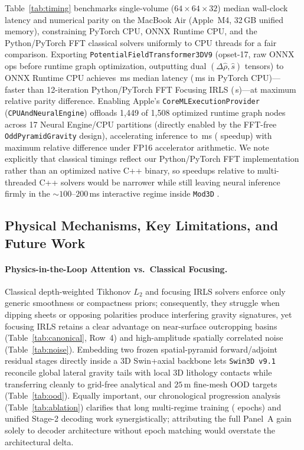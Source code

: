 \documentclass[11pt,a4paper]{article}
\begin{document}


Table~\ref{tab:timing} benchmarks single-volume ($64\times 64\times 32$) median wall-clock latency and numerical parity on the MacBook Air (Apple~M4, 32\,GB unified memory), constraining PyTorch CPU, ONNX Runtime CPU, and the Python/PyTorch FFT classical solvers uniformly to \valCpuThreads{} CPU threads for a fair comparison. Exporting \texttt{PotentialFieldTransformer3DV9} (opset-17, \valOnnxNodes{} raw ONNX ops before runtime graph optimization, outputting dual $(\Delta\hat{\rho}, \hat{s})$ tensors) to ONNX Runtime CPU achieves \valTimeOnnxCpuMs{}\,ms median latency (\valTimePtMs{}\,ms in PyTorch CPU)---\valSpeedupOnnxVsFoc{} faster than 12-iteration Python/PyTorch FFT Focusing IRLS (\valTimeFocS{}\,s)---at \valTimeOnnxCpuDiff{} maximum relative parity difference. Enabling Apple's \texttt{CoreMLExecutionProvider} (\texttt{CPUAndNeuralEngine}) offloads 1,449 of 1,508 optimized runtime graph nodes across 17 Neural Engine/CPU partitions (directly enabled by the FFT-free \texttt{OddPyramidGravity} design), accelerating inference to \valTimeCoremlMs{}\,ms (\valSpeedupCoremlVsFoc{} speedup) with \valTimeCoremlDiff{} maximum relative difference under FP16 accelerator arithmetic. We note explicitly that classical timings reflect our Python/PyTorch FFT implementation rather than an optimized native C++ binary, so speedups relative to multi-threaded C++ solvers would be narrower while still leaving neural inference firmly in the $\sim 100\text{--}200$\,ms interactive regime inside \texttt{Mod3D} \citep{cerovsky_mod3d}.

\subsection{Physical Mechanisms, Key Limitations, and Future Work}

\paragraph{Physics-in-the-Loop Attention vs.\ Classical Focusing.}
Classical depth-weighted Tikhonov $L_2$ and focusing IRLS solvers enforce only generic smoothness or compactness priors; consequently, they struggle when dipping sheets or opposing polarities produce interfering gravity signatures, yet focusing IRLS retains a clear advantage on near-surface outcropping basins (Table~\ref{tab:canonical}, Row~4) and high-amplitude spatially correlated noise (Table~\ref{tab:noise}). Embedding two frozen spatial-pyramid forward/adjoint residual stages directly inside a 3D Swin+axial backbone lets \texttt{Swin3D v9.1} reconcile global lateral gravity tails with local 3D lithology contacts while transferring cleanly to grid-free analytical and $25$\,m fine-mesh OOD targets (Table~\ref{tab:ood}). Equally important, our chronological progression analysis (Table~\ref{tab:ablation}) clarifies that long multi-regime training (\valVNineOneEp{} epochs) and unified Stage-2 decoding work synergistically; attributing the full Panel~A gain solely to decoder architecture without epoch matching would overstate the architectural delta.
\end{document}

